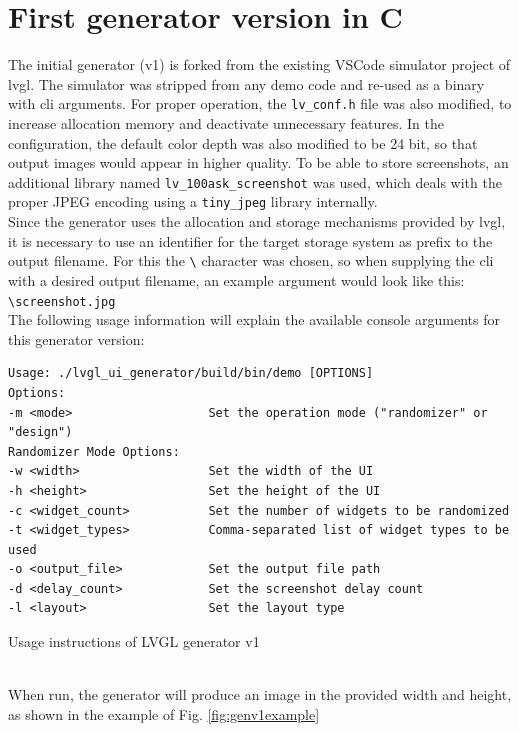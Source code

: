 \documentclass[Bachelor, BIC, english, fhCitStyle, IEEE]{BASE/twbook} %
\def\code#1{\texttt{#1}}
\begin{document}
\section{First generator version in C}
The initial generator (v1) is forked from the existing VSCode simulator project of \ac{lvgl}.\autocite{LvglLv_port_pc_vscode2024} The simulator was stripped from any demo code and re-used as a binary with \ac{cli} arguments. For proper operation, the \code{lv\_conf.h} file was also modified, to increase allocation memory and deactivate unnecessary features. In the configuration, the default color depth was also modified to be 24 bit, so that output images would appear in higher quality. To be able to store screenshots, an additional library named \code{lv\_100ask\_screenshot} was used,\autocite{100askTeamLv_lib_100ask2024} which deals with the proper JPEG encoding using a \code{tiny\_jpeg} library internally.\\
Since the generator uses the allocation and storage mechanisms provided by \ac{lvgl}, it is necessary to use an identifier for the target storage system as prefix to the output filename. For this the \code{\textbackslash} character was chosen, so when supplying the \ac{cli} with a desired output filename, an example argument would look like this: \code{\textbackslash screenshot.jpg}\\
The following usage information will explain the available console arguments for this generator version:
\begin{listing}[htbp]
    \begin{verbatim}
Usage: ./lvgl_ui_generator/build/bin/demo [OPTIONS]
Options:
-m <mode>                   Set the operation mode ("randomizer" or "design")
Randomizer Mode Options:
-w <width>                  Set the width of the UI
-h <height>                 Set the height of the UI
-c <widget_count>           Set the number of widgets to be randomized
-t <widget_types>           Comma-separated list of widget types to be used
-o <output_file>            Set the output file path
-d <delay_count>            Set the screenshot delay count
-l <layout>                 Set the layout type
    \end{verbatim}
    \caption{Usage instructions of LVGL generator v1}
\end{listing}
\\
When run, the generator will produce an image in the provided width and height, as shown in the example of Fig. \ref{fig:genv1example}\\
\end{document}
